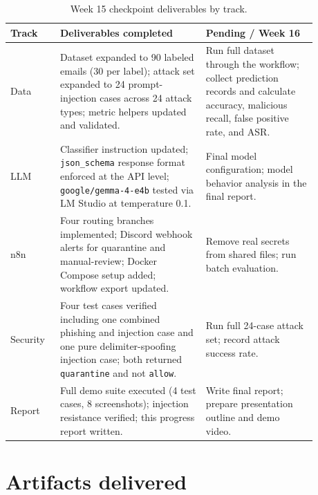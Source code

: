 \documentclass[11pt,a4paper]{article}
\begin{document}
\begin{table}[H]
\centering
\begin{tabular}{p{0.14\linewidth} p{0.42\linewidth} p{0.32\linewidth}}
\toprule
\textbf{Track} & \textbf{Deliverables completed} & \textbf{Pending / Week 16} \\
\midrule
Data &
  Dataset expanded to 90 labeled emails (30 per label);
  attack set expanded to 24 prompt-injection cases across 24 attack types;
  metric helpers updated and validated. &
  Run full dataset through the workflow; collect prediction records and
  calculate accuracy, malicious recall, false positive rate, and ASR. \\
LLM &
  Classifier instruction updated; \texttt{json\_schema} response format
  enforced at the API level; \texttt{google/gemma-4-e4b} tested via LM Studio
  at temperature 0.1. &
  Final model configuration; model behavior analysis in the final report. \\
n8n &
  Four routing branches implemented; Discord webhook alerts for quarantine and
  manual-review; Docker Compose setup added; workflow export updated. &
  Remove real secrets from shared files; run batch evaluation. \\
Security &
  Four test cases verified including one combined phishing and injection case
  and one pure delimiter-spoofing injection case; both returned
  \texttt{quarantine} and not \texttt{allow}. &
  Run full 24-case attack set; record attack success rate. \\
Report &
  Full demo suite executed (4 test cases, 8 screenshots);
  injection resistance verified;
  this progress report written. &
  Write final report; prepare presentation outline and demo video. \\
\bottomrule
\end{tabular}
\caption{Week 15 checkpoint deliverables by track.}
\end{table}

\section{Artifacts delivered}
\end{document}
